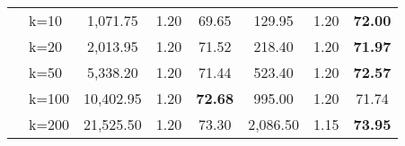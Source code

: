 \begin{table}[htbp]
\begin{tabular}{|l|l|c|c|c|c|c|c|}
     & k=10 & 1,071.75 & 1.20 & 69.65 & 129.95 & 1.20 & \textbf{72.00} \\ 
     & k=20 & 2,013.95 & 1.20 & 71.52 & 218.40 & 1.20 & \textbf{71.97} \\ 
     & k=50 & 5,338.20 & 1.20 & 71.44 & 523.40 & 1.20 & \textbf{72.57} \\ 
     & k=100 & 10,402.95 & 1.20 & \textbf{72.68} & 995.00 & 1.20 & 71.74 \\ 
     & k=200 & 21,525.50 & 1.20 & 73.30 & 2,086.50 & 1.15 & \textbf{73.95} \\ \hline
    \end{tabular}
    \label{results:usecase_summary}
    \end{table}
    